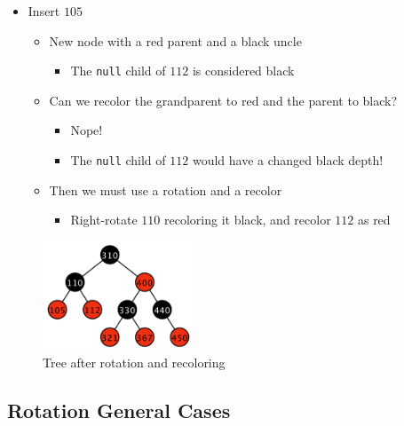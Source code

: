 \documentclass[
  10pt,
  english,
  letterpaper,
,tablecaptionabove
]{scrartcl}
\newcommand{\passthrough}[1]{#1}
\providecommand{\tightlist}{%
  \setlength{\itemsep}{0pt}\setlength{\parskip}{0pt}}
\begin{document}
\begin{itemize}
\tightlist
\item
  Insert \(105\)

  \begin{itemize}
  \tightlist
  \item
    New node with a red parent and a black uncle

    \begin{itemize}
    \tightlist
    \item
      The \passthrough{\lstinline!null!} child of \(112\) is considered
      black
    \end{itemize}
  \item
    Can we recolor the grandparent to red and the parent to black?

    \begin{itemize}
    \tightlist
    \item
      Nope!
    \item
      The \passthrough{\lstinline!null!} child of \(112\) would have a
      changed black depth!
    \end{itemize}
  \item
    Then we must use a rotation and a recolor

    \begin{itemize}
    \tightlist
    \item
      Right-rotate \(110\) recoloring it black, and recolor \(112\) as
      red
    \end{itemize}
  \end{itemize}
\end{itemize}

\begin{figure}
\centering
\includegraphics[width=0.4\textwidth,height=\textheight]{images/6.png}
\caption{Tree after rotation and recoloring}
\end{figure}

\hypertarget{rotation-general-cases}{%
\subsection{Rotation General Cases}\label{rotation-general-cases}}
\end{document}
